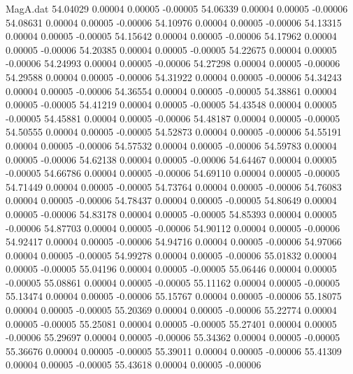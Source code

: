 \begin{filecontents}{MagA.dat}
  54.04029    0.00004    0.00005   -0.00005
  54.06339    0.00004    0.00005   -0.00006
  54.08631    0.00004    0.00005   -0.00006
  54.10976    0.00004    0.00005   -0.00006
  54.13315    0.00004    0.00005   -0.00005
  54.15642    0.00004    0.00005   -0.00006
  54.17962    0.00004    0.00005   -0.00006
  54.20385    0.00004    0.00005   -0.00005
  54.22675    0.00004    0.00005   -0.00006
  54.24993    0.00004    0.00005   -0.00006
  54.27298    0.00004    0.00005   -0.00006
  54.29588    0.00004    0.00005   -0.00006
  54.31922    0.00004    0.00005   -0.00006
  54.34243    0.00004    0.00005   -0.00006
  54.36554    0.00004    0.00005   -0.00005
  54.38861    0.00004    0.00005   -0.00005
  54.41219    0.00004    0.00005   -0.00005
  54.43548    0.00004    0.00005   -0.00005
  54.45881    0.00004    0.00005   -0.00006
  54.48187    0.00004    0.00005   -0.00005
  54.50555    0.00004    0.00005   -0.00005
  54.52873    0.00004    0.00005   -0.00006
  54.55191    0.00004    0.00005   -0.00006
  54.57532    0.00004    0.00005   -0.00006
  54.59783    0.00004    0.00005   -0.00006
  54.62138    0.00004    0.00005   -0.00006
  54.64467    0.00004    0.00005   -0.00005
  54.66786    0.00004    0.00005   -0.00006
  54.69110    0.00004    0.00005   -0.00005
  54.71449    0.00004    0.00005   -0.00005
  54.73764    0.00004    0.00005   -0.00006
  54.76083    0.00004    0.00005   -0.00006
  54.78437    0.00004    0.00005   -0.00005
  54.80649    0.00004    0.00005   -0.00006
  54.83178    0.00004    0.00005   -0.00005
  54.85393    0.00004    0.00005   -0.00006
  54.87703    0.00004    0.00005   -0.00006
  54.90112    0.00004    0.00005   -0.00006
  54.92417    0.00004    0.00005   -0.00006
  54.94716    0.00004    0.00005   -0.00006
  54.97066    0.00004    0.00005   -0.00005
  54.99278    0.00004    0.00005   -0.00006
  55.01832    0.00004    0.00005   -0.00005
  55.04196    0.00004    0.00005   -0.00005
  55.06446    0.00004    0.00005   -0.00005
  55.08861    0.00004    0.00005   -0.00005
  55.11162    0.00004    0.00005   -0.00005
  55.13474    0.00004    0.00005   -0.00006
  55.15767    0.00004    0.00005   -0.00006
  55.18075    0.00004    0.00005   -0.00005
  55.20369    0.00004    0.00005   -0.00006
  55.22774    0.00004    0.00005   -0.00005
  55.25081    0.00004    0.00005   -0.00005
  55.27401    0.00004    0.00005   -0.00006
  55.29697    0.00004    0.00005   -0.00006
  55.34362    0.00004    0.00005   -0.00005
  55.36676    0.00004    0.00005   -0.00005
  55.39011    0.00004    0.00005   -0.00006
  55.41309    0.00004    0.00005   -0.00005
  55.43618    0.00004    0.00005   -0.00006

\end{filecontents}
